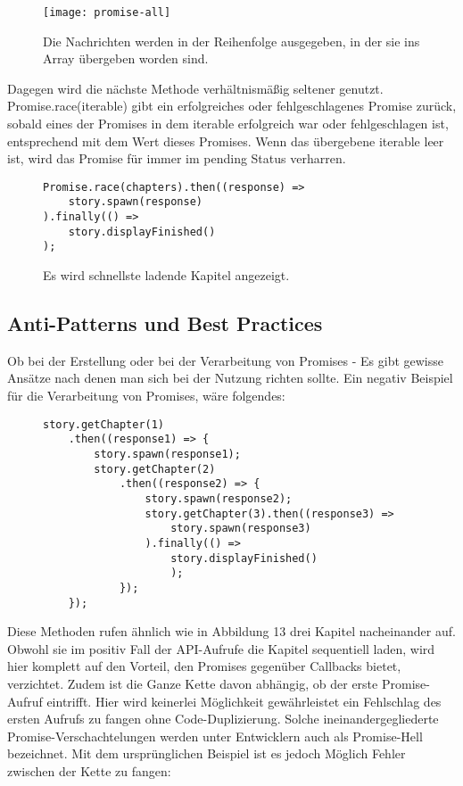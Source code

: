 \begin{figure}[H]
\centering
\texttt{[image: promise-all]}
\caption{Die Nachrichten werden in der Reihenfolge ausgegeben, in der sie ins Array übergeben worden sind.}
\end{figure}

\noindent
Dagegen wird die nächste Methode verhältnismäßig seltener genutzt. Promise.race(iterable) gibt ein erfolgreiches oder fehlgeschlagenes Promise zurück, sobald eines der Promises in dem iterable erfolgreich war oder fehlgeschlagen ist, entsprechend mit dem Wert dieses Promises. Wenn das übergebene iterable leer ist, wird das Promise für immer im pending Status verharren.\cite{promise-race}

\begin{figure}[H]
\begin{lstlisting}[basicstyle=\small]
Promise.race(chapters).then((response) =>
    story.spawn(response)
).finally(() =>
    story.displayFinished()
);
\end{lstlisting}
\caption{Es wird schnellste ladende Kapitel angezeigt.}
\end{figure}

\subsection{Anti-Patterns und Best Practices}

Ob bei der Erstellung oder bei der Verarbeitung von Promises - Es gibt gewisse Ansätze nach denen man sich bei der Nutzung richten sollte. Ein negativ Beispiel für die Verarbeitung von Promises, wäre folgendes:

\begin{figure}[H]
\begin{lstlisting}[basicstyle=\small]
story.getChapter(1)
    .then((response1) => {
        story.spawn(response1);
        story.getChapter(2)
            .then((response2) => {
                story.spawn(response2);
                story.getChapter(3).then((response3) =>
                    story.spawn(response3)
                ).finally(() => 
                    story.displayFinished()
                    );
            });
    });
\end{lstlisting}
\end{figure}

\noindent
Diese Methoden rufen ähnlich wie in Abbildung 13 drei Kapitel nacheinander auf. Obwohl sie im positiv Fall der API-Aufrufe die Kapitel sequentiell laden, wird hier komplett auf den Vorteil, den Promises gegenüber Callbacks bietet, verzichtet. Zudem ist die Ganze Kette davon abhängig, ob der erste Promise-Aufruf eintrifft. Hier wird keinerlei Möglichkeit gewährleistet ein Fehlschlag des ersten Aufrufs zu fangen ohne Code-Duplizierung. Solche ineinandergegliederte Promise-Verschachtelungen werden unter Entwicklern auch als \glqq{}Promise-Hell\grqq{} bezeichnet.
Mit dem ursprünglichen Beispiel ist es jedoch Möglich Fehler zwischen der Kette zu fangen:

